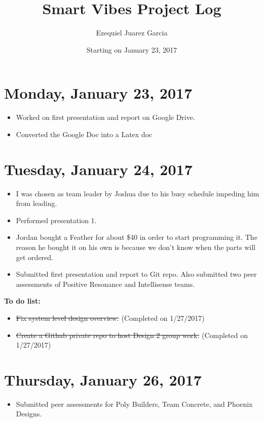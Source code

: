 \documentclass[12pt]{article}
\begin{document}
\title{Smart Vibes Project Log}
\author{Ezequiel Juarez Garcia}
\date{Starting on January 23, 2017}
\maketitle

\newpage

\section*{Monday, January 23, 2017}
\begin{itemize}
\item Worked on first presentation and report on Google Drive.
\item Converted the Google Doc into a Latex doc
\end{itemize}

\section*{Tuesday, January 24, 2017}
\begin{itemize}
\item I was chosen as team leader by Joshua due to his busy schedule impeding him from leading.
\item Performed presentation 1.
\item Jordan bought a Feather for about \$40 in order to start programming it. The reason he bought it on his own is because we don't know when the parts will get ordered.
\item Submitted first presentation and report to Git repo. Also submitted two peer assessments of Positive Resonance and Intellisense teams.
\end{itemize}

\textbf{To do list:}
\begin{itemize}
\item \sout{Fix system level design overview.} (Completed on 1/27/2017)
\item \sout{Create a Github private repo to host Design 2 group work.} (Completed on 1/27/2017)
\end{itemize}

\section*{Thursday, January 26, 2017}
\begin{itemize}
\item Submitted peer assessments for Poly Builders, Team Concrete, and Phoenix Designs.
\end{itemize}
\end{document}
